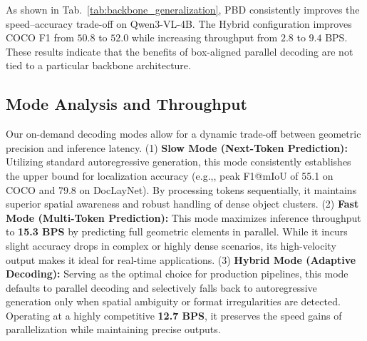 \documentclass{llmxive}
\providecommand{\eg}{e.g.,\xspace}
\providecommand{\arraystretch}{1.2}
\begin{document}
\begin{table}[t]

    \vspace{-5mm}
    \captionsetup{
        width=\linewidth,
        justification=raggedright,
        singlelinecheck=false
    }
    \small
    \renewcommand{\arraystretch}{0.88}
    \setlength{\tabcolsep}{3.2pt}
    \vspace{-5mm}

\caption{\textbf{Backbone generalization.}}
\label{tab:backbone_generalization}
\end{table}

As shown in Tab.~\ref{tab:backbone_generalization}, PBD consistently improves the speed--accuracy trade-off on Qwen3-VL-4B. The Hybrid configuration improves COCO F1 from $50.8$ to $52.0$ while increasing throughput from $2.8$ to $9.4$ BPS. These results indicate that the benefits of box-aligned parallel decoding are not tied to a particular backbone architecture.

\subsection{Mode Analysis and Throughput}
Our on-demand decoding modes allow for a dynamic trade-off between geometric precision and inference latency. (1) \textbf{Slow Mode (Next-Token Prediction):} Utilizing standard autoregressive generation, this mode consistently establishes the upper bound for localization accuracy (\eg, peak F1@mIoU of 55.1 on COCO and 79.8 on DocLayNet). By processing tokens sequentially, it maintains superior spatial awareness and robust handling of dense object clusters. (2) \textbf{Fast Mode (Multi-Token Prediction):} This mode maximizes inference throughput to \textbf{15.3 BPS} by predicting full geometric elements in parallel. While it incurs slight accuracy drops in complex or highly dense scenarios, its high-velocity output makes it ideal for real-time applications. (3) \textbf{Hybrid Mode (Adaptive Decoding):} Serving as the optimal choice for production pipelines, this mode defaults to parallel decoding and selectively falls back to autoregressive generation only when spatial ambiguity or format irregularities are detected. Operating at a highly competitive \textbf{12.7 BPS}, it preserves the speed gains of parallelization while maintaining precise outputs.
\end{document}

